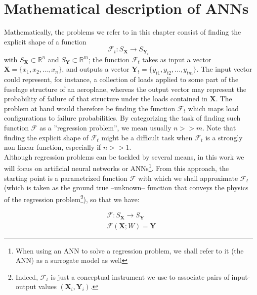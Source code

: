 \section{Mathematical description of ANNs}
\indent Mathematically, the problems we refer to in this chapter consist of finding the explicit shape of a function
\begin{equation}\label{eq:F}
	\mathcal{F}_{t}:S_{\mathbf{X}}\rightarrow S_{\mathbf{Y}_{t}}
\end{equation}
with $S_{\mathbf{X}}\subset\mathbb{R}^n$ and $S_{\mathbf{Y}}\subset\mathbb{R}^m$; \ie the function $\mathcal{F}_t$ takes as input a vector $\mathbf{X}=\{x_1,x_2,\ldots,x_n\}$, and outputs a vector $\mathbf{Y}_t=\{y_{t1},y_{t2},\ldots,y_{tm}\}$. The input vector could represent, for instance, a collection of loads applied to some part of the fuselage structure of an aeroplane, whereas the output vector may represent the probability of failure of that structure under the loads contained in $\mathbf{X}$. The problem at hand would therefore be finding the function $\mathcal{F}_t$ which maps load configurations to failure probabilities. By categorizing the task of finding such function $\mathcal{F}$ as a ''regression problem'', we mean usually $n>>m$. Note that finding the explicit shape of $\mathcal{F}_t$ might be a difficult task when $\mathcal{F}_t$ is a strongly non-linear function, especially if $n>>1$.\\
%
\indent Although regression problems can be tackled by several means, in this work we will focus on artificial neural networks or ANNs\cite{Marsland2015Machine}\footnote{When using an ANN to solve a regression problem, we shall refer to it (the ANN) as a surrogate model as well}. From this approach, the starting point is a parametrized function $\mathcal{F}$ with which we shall approximate $\mathcal{F}_t$ (which is taken as the ground true --unknown-- function that conveys the physics of the regression problem\footnote{Indeed, $\mathcal{F}_t$ is just a conceptual instrument we use to associate pairs of input-output values $(\mathbf{X}_i,\mathbf{Y}_i)$.}), so that we have:

\begin{align}
	& {\mathcal{F}} : S_{\mathbf{X}} \rightarrow S_{\mathbf{{Y}}} \\
	& {\mathcal{F}}(\mathbf{X}; W) = \mathbf{{Y}} \label{eq:Fhat}
\end{align}

